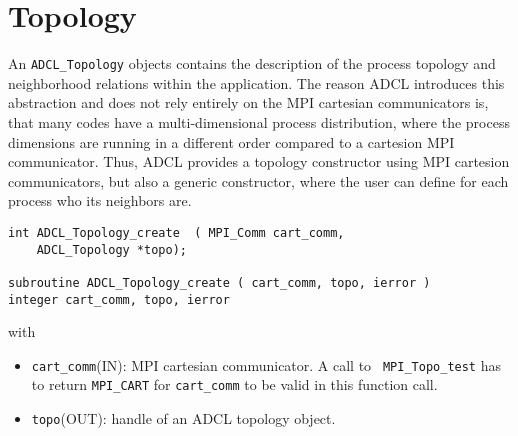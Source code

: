 \section{Topology}

An {\tt ADCL\_Topology} objects contains the description of the process
topology and neighborhood relations within the application. The reason ADCL
introduces this abstraction and does not rely entirely on the MPI cartesian
communicators is, that many codes have a multi-dimensional process
distribution, where the process dimensions are running in a different order
compared to a cartesion MPI communicator. Thus, ADCL provides a topology
constructor using MPI cartesion communicators, but also a generic constructor,
where the user can define for each process who its neighbors are.

\begin{verbatim}
int ADCL_Topology_create  ( MPI_Comm cart_comm, 
    ADCL_Topology *topo);

subroutine ADCL_Topology_create ( cart_comm, topo, ierror )
integer cart_comm, topo, ierror
\end{verbatim}
with
\begin{itemize}

\item {\tt cart\_comm}(IN): MPI cartesian communicator. A call to {\tt
  MPI\_Topo\_test} has to return {\tt MPI\_CART} for {\tt cart\_comm} to be
  valid in this function call.

\item {\tt topo}(OUT): handle of an ADCL topology object. 
\end{itemize}

